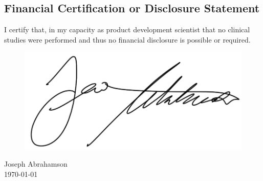 \newpage
\subsection{Financial Certification or Disclosure Statement}

I certify that, in my capacity as product development scientist that
no clinical studies were performed and thus no financial disclosure is
possible or required.

\begin{figure}[H]
  \includegraphics[width=0.35\linewidth]{imgs/ja-sig}
\end{figure}

\noindent Joseph Abrahamson \\
\today

